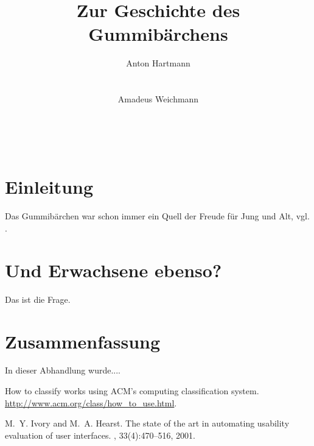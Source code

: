\documentclass{seminarvorlage}
\begin{document}
\title{Zur Geschichte des Gummibärchens}
\author{
  \alignauthor Anton Hartmann\\
    \\
    \\
  \alignauthor Amadeus Weichmann\\
    \\
    \\
    \\
}

\maketitle



\section{Einleitung}

Das Gummibärchen war schon immer ein Quell der Freude für Jung
und Alt, vgl. \cite{acmcategories,Ivory2001}.

\section{Und Erwachsene ebenso?}

Das ist die Frage.

\section{Zusammenfassung}
In dieser Abhandlung wurde....


\begin{thebibliography}{9}
How to classify works using ACM's computing classification system.
\newblock \url{http://www.acm.org/class/how_to_use.html}.

M.~Y. Ivory and M.~A. Hearst.
\newblock The state of the art in automating usability evaluation of user
  interfaces.
, 33(4):470--516, 2001.

\end{thebibliography}

%
\end{document}
